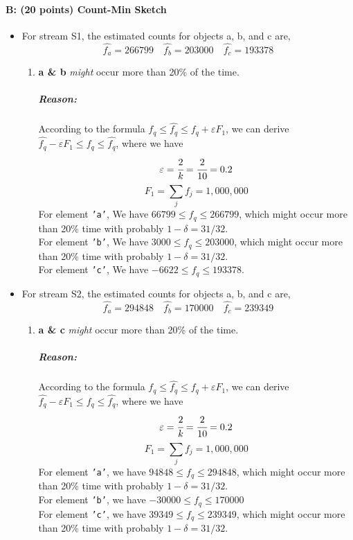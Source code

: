 \documentclass[11pt]{article}
\begin{document}
\paragraph{B: (20 points) Count-Min Sketch}
\begin{itemize}
\item For stream S1, the estimated counts for objects a, b, and c are,
$$\hat{f_a}=266799 \quad \hat{f_b}=203000 \quad \hat{f_c}=193378$$
\begin{enumerate}
\item \textbf{a \& b} \textit{might} occur more than 20\% of the time.
\subparagraph{Reason:}
According to the formula $f_q\le\hat{f_q}\le f_q+\varepsilon F_1$, we can derive $\hat{f_q}-\varepsilon F_1\le f_q\le \hat{f_q}$, where we have
$$\varepsilon=\cfrac{2}{k}=\cfrac{2}{10}=0.2$$
$$F_1=\sum_jf_j=1,000,000$$
For element \texttt{'a'}, We have $66799\le f_q\le 266799$, which might occur more than 20\% time with probably $1-\delta = 31/32$.\\
For element \texttt{'b'}, We have $3000\le f_q\le 203000$, which might occur more than 20\% time with probably $1-\delta = 31/32$.\\
For element \texttt{'c'}, We have $-6622\le f_q\le 193378$.\\
\end{enumerate}

\item For stream S2, the estimated counts for objects a, b, and c are,
$$\hat{f_a}=294848 \quad \hat{f_b}=170000 \quad \hat{f_c}=239349$$
\begin{enumerate}
\item \textbf{a \& c} \textit{might} occur more than 20\% of the time.
\subparagraph{Reason:}
According to the formula $f_q\le\hat{f_q}\le f_q+\varepsilon F_1$, we can derive $\hat{f_q}-\varepsilon F_1\le f_q\le \hat{f_q}$, where we have
$$\varepsilon=\cfrac{2}{k}=\cfrac{2}{10}=0.2$$
$$F_1=\sum_jf_j=1,000,000$$
For element \texttt{'a'}, we have $94848\le f_q\le 294848$, which might occur more than 20\% time with probably $1-\delta = 31/32$.\\
For element \texttt{'b'}, we have $-30000\le f_q\le 170000$\\
For element \texttt{'c'}, we have $39349\le f_q\le 239349$, which might occur more than 20\% time with probably $1-\delta = 31/32$.\\
\end{enumerate}
\end{itemize}
\end{document}
